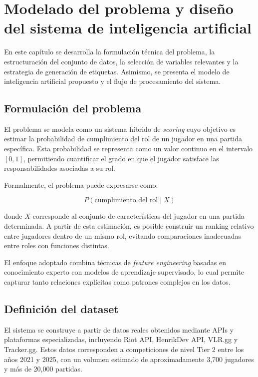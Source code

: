 \documentclass{ULBreport} %
\begin{document}
\chapter{Modelado del problema y diseño del sistema de inteligencia artificial}

En este capítulo se desarrolla la formulación técnica del problema, la estructuración del conjunto de datos, la selección de variables relevantes y la estrategia de generación de etiquetas. Asimismo, se presenta el modelo de inteligencia artificial propuesto y el flujo de procesamiento del sistema.

\section{Formulación del problema}

El problema se modela como un sistema híbrido de \textit{scoring} cuyo objetivo es estimar la probabilidad de cumplimiento del rol de un jugador en una partida específica. Esta probabilidad se representa como un valor continuo en el intervalo $[0,1]$, permitiendo cuantificar el grado en que el jugador satisface las responsabilidades asociadas a su rol.

Formalmente, el problema puede expresarse como:

\[
P(\text{cumplimiento del rol} \mid X)
\]

donde $X$ corresponde al conjunto de características del jugador en una partida determinada. A partir de esta estimación, es posible construir un ranking relativo entre jugadores dentro de un mismo rol, evitando comparaciones inadecuadas entre roles con funciones distintas.

El enfoque adoptado combina técnicas de \textit{feature engineering} basadas en conocimiento experto con modelos de aprendizaje supervisado, lo cual permite capturar tanto relaciones explícitas como patrones complejos en los datos.

\section{Definición del dataset}

El sistema se construye a partir de datos reales obtenidos mediante APIs y plataformas especializadas, incluyendo Riot API, HenrikDev API, VLR.gg y Tracker.gg. Estos datos corresponden a competiciones de nivel Tier 2 entre los años 2021 y 2025, con un volumen estimado de aproximadamente 3,700 jugadores y más de 20,000 partidas.
\end{document}

